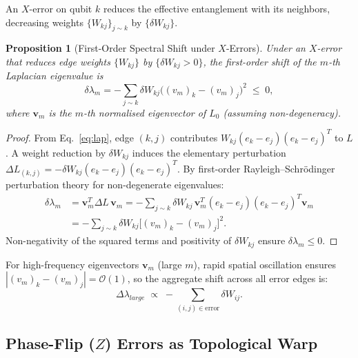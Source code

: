 \documentclass[11pt,a4paper]{article}
\newtheorem{proposition}[theorem]{Proposition}
\theoremstyle{definition}
\theoremstyle{remark}
\begin{document}
An $X$-error on qubit $k$ reduces the effective entanglement with its neighbors, decreasing
weights $\{W_{kj}\}_{j\sim k}$ by $\{\delta W_{kj}\}$.

\begin{proposition}[First-Order Spectral Shift under $X$-Errors]\label{prop:xshift}
Under an $X$-error that reduces edge weights $\{W_{kj}\}$ by $\{\delta W_{kj}>0\}$, the
first-order shift of the $m$-th Laplacian eigenvalue is
\begin{equation}\label{eq:xshift}
  \delta\lambda_m
    = -\sum_{j\sim k}\delta W_{kj}\bigl((v_m)_k-(v_m)_j\bigr)^2
    \;\le\; 0,
\end{equation}
where $\mathbf{v}_m$ is the $m$-th normalised eigenvector of $L_0$ (assuming non-degeneracy).
\end{proposition}

\begin{proof}
From Eq.~\eqref{eq:lap}, edge $(k,j)$ contributes $W_{kj}(e_k-e_j)(e_k-e_j)^T$ to $L$.
A weight reduction by $\delta W_{kj}$ induces the elementary perturbation
$\Delta L_{(k,j)}=-\delta W_{kj}(e_k-e_j)(e_k-e_j)^T$.
By first-order Rayleigh--Schr\"odinger perturbation theory for non-degenerate eigenvalues:
\begin{align*}
  \delta\lambda_m
    &= \mathbf{v}_m^T\Delta L\,\mathbf{v}_m
     = -\sum_{j\sim k}\delta W_{kj}\,
         \mathbf{v}_m^T(e_k-e_j)(e_k-e_j)^T\mathbf{v}_m \\
    &= -\sum_{j\sim k}\delta W_{kj}\bigl[(v_m)_k-(v_m)_j\bigr]^2.
\end{align*}
Non-negativity of the squared terms and positivity of $\delta W_{kj}$ ensure
$\delta\lambda_m\le 0$.
\end{proof}

For high-frequency eigenvectors $\mathbf{v}_m$ (large $m$), rapid spatial oscillation ensures
$|(v_m)_k-(v_m)_j|=\mathcal{O}(1)$, so the aggregate shift across all error edges is:
\begin{equation}\label{eq:xlarge}
  \Delta\lambda_{large} \;\propto\; -\sum_{(i,j)\in\mathrm{error}}\delta W_{ij}.
\end{equation}

\subsection{Phase-Flip ($Z$) Errors as Topological Warp}
\end{document}
